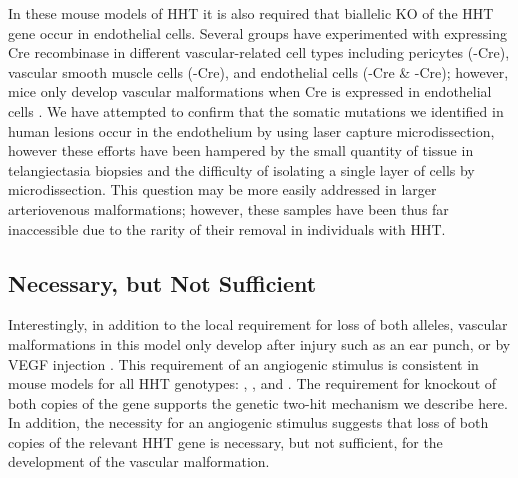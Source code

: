 	In these mouse models of HHT it is also required that biallelic KO of the HHT gene occur in endothelial cells. Several groups have experimented with expressing Cre recombinase in different vascular-related cell types including pericytes (-Cre), vascular smooth muscle cells (-Cre), and endothelial cells (-Cre \& -Cre); however, mice only develop vascular malformations when Cre is expressed in endothelial cells \citep{tualchalot2015, choi2014, garridomartin2014, mahmoud2010}. We have attempted to confirm that the somatic mutations we identified in human lesions occur in the endothelium by using laser capture microdissection, however these efforts have been hampered by the small quantity of tissue in telangiectasia biopsies and the difficulty of isolating a single layer of cells by microdissection. This question may be more easily addressed in larger arteriovenous malformations; however, these samples have been thus far inaccessible due to the rarity of their removal in individuals with HHT.
	
\subsection{Necessary, but Not Sufficient}
Interestingly, in addition to the local requirement for loss of both alleles, vascular malformations in this model only develop after injury such as an ear punch, or by VEGF injection \citep{choi2012}. This requirement of an angiogenic stimulus is consistent in mouse models for all HHT genotypes: , , and  \citep{kim2018}. The requirement for knockout of both copies of the gene supports the genetic two-hit mechanism we describe here. In addition, the necessity for an angiogenic stimulus suggests that loss of both copies of the relevant HHT gene is necessary, but not sufficient, for the development of the vascular malformation. 

